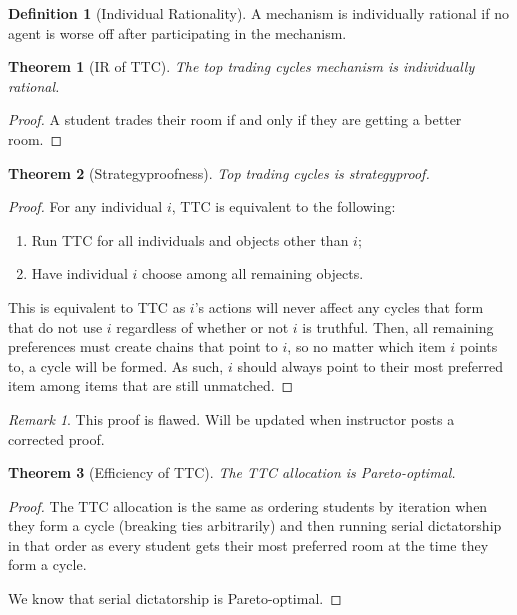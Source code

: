 \documentclass[dvipsnames]{article}
\newtheorem{theorem}{Theorem}[section]
\theoremstyle{definition}
\newtheorem{definition}{Definition}[section]
\theoremstyle{remark}
\newtheorem*{remark}{Remark}
\begin{document}
\begin{definition}[Individual Rationality]
	A mechanism is individually rational if no agent is worse off after participating in the mechanism. 
\end{definition}

\begin{theorem}[IR of TTC]
	The top trading cycles mechanism is individually rational.
\end{theorem}

\begin{proof}
	A student trades their room if and only if they are getting a better room.
\end{proof}

\begin{theorem}[Strategyproofness]
	Top trading cycles is strategyproof.
\end{theorem}

\begin{proof}
	For any individual $i$, TTC is equivalent to the following:
	\begin{enumerate}
		\item Run TTC for all individuals and objects other than $i$;
		\item Have individual $i$ choose among all remaining objects.
	\end{enumerate}
	This is equivalent to TTC as $i$'s actions will never affect any cycles that form that do not use $i$ regardless of whether or not $i$ is truthful. Then, all remaining preferences must create chains that point to $i$, so no matter which item $i$ points to, a cycle will be formed. As such, $i$ should always point to their most preferred item among items that are still unmatched. 
\end{proof}

\begin{remark}
	This proof is flawed. Will be updated when instructor posts a corrected proof.
\end{remark}

\begin{theorem}[Efficiency of TTC]
	The TTC allocation is Pareto-optimal. 
\end{theorem}

\begin{proof}
	The TTC allocation is the same as ordering students by iteration when they form a cycle (breaking ties arbitrarily) and then running serial dictatorship in that order as every student gets their most preferred room at the time they form a cycle.
	
	We know that serial dictatorship is Pareto-optimal. 
\end{proof}
\end{document}
